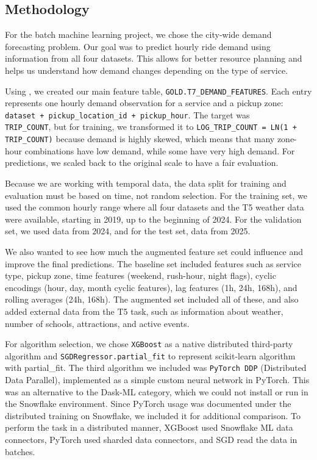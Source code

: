 \documentclass[fleqn,moreauthors,9pt]{ds_report}
\begin{document}
\subsection*{Methodology}

For the batch machine learning project, we chose the city-wide demand forecasting problem. Our goal was to predict hourly ride demand using information from all four datasets. This allows for better resource planning and helps us understand how demand changes depending on the type of service.

Using , we created our main feature table, \texttt{GOLD.T7\_DEMAND\_FEATURES}. Each entry represents one hourly demand observation for a service and a pickup zone: \texttt{dataset + pickup\_location\_id + pickup\_hour}. The target was \\ \texttt{TRIP\_COUNT}, but for training, we transformed it to \texttt{LOG\_TRIP\_COUNT = LN(1 + TRIP\_COUNT)} because demand is highly skewed, which means that many zone-hour combinations have low demand, while some have very high demand. For predictions, we scaled back to the original scale to have a fair evaluation.

Because we are working with temporal data, the data split for training and evaluation must be based on time, not random selection. For the training set, we used the common hourly range where all four datasets and the T5 weather data were available, starting in 2019, up to the beginning of 2024. For the validation set, we used data from 2024, and for the test set, data from 2025.

We also wanted to see how much the augmented feature set could influence and improve the final predictions. The baseline set included features such as service type, pickup zone, time features (weekend, rush-hour, night flags), cyclic encodings (hour, day, month cyclic features), lag features (1h, 24h, 168h), and rolling averages (24h, 168h). The augmented set included all of these, and also added external data from the T5 task, such as information about weather, number of schools, attractions, and active events.

For algorithm selection, we chose \texttt{XGBoost} as a native distributed third-party algorithm and \texttt{SGDRegressor.partial\_fit} to represent scikit-learn algorithm with partial\_fit. The third algorithm we included was \texttt{PyTorch DDP} (Distributed Data Parallel), implemented as a simple custom neural network in PyTorch. This was an alternative to the Dask-ML category, which we could not install or run in the Snowflake environment. Since PyTorch usage was documented under the distributed training on Snowflake, we included it for additional comparison. To perform the task in a distributed manner, XGBoost used Snowflake ML data connectors, PyTorch used sharded data connectors, and SGD read the data in batches.
\end{document}
